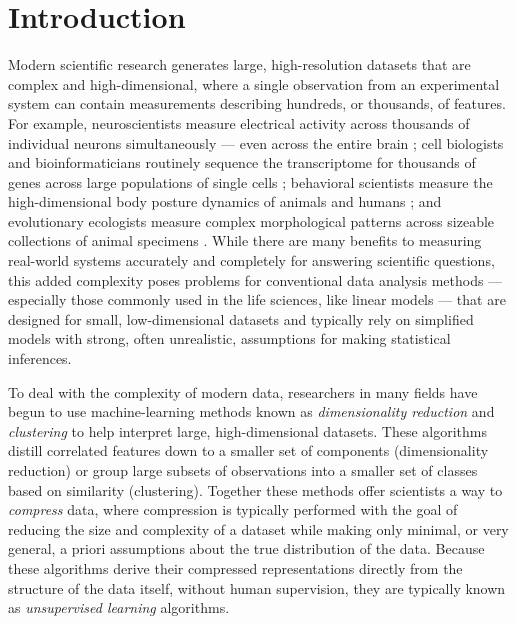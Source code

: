 \documentclass[11pt,a4paper,oneside]{book}
\begin{document}
\section{Introduction}
Modern scientific research generates large, high-resolution datasets that are complex and high-dimensional, where a single observation from an experimental system can contain measurements describing hundreds, or thousands, of features. For example, neuroscientists measure electrical activity across thousands of individual neurons simultaneously \citep{jun2017fully, stringer2019high, stringer2019spontaneous} --- even across the entire brain \citep{ahrens2012brain,ahrens2013whole}; cell biologists and bioinformaticians routinely sequence the transcriptome for thousands of genes across large populations of single cells \citep{samusik2016automated, la2018rna, becht2019dimensionality, linderman2019fast}; behavioral scientists measure the high-dimensional body posture dynamics of animals and humans \citep{stephens2008dimensionality, stephens2011emergence, kain2013leg, berman2014mapping, wiltschko2015mapping, klibaite2017unsupervised, Costa1501, cande2018optogenetic, mathis2018deeplabcut, chambers2019pose, gunel2019deepfly3d, graving2019deepposekit, klibaite2019interacting,
nath2019using,pereira2019fast, bala2020openmonkeystudio, ebbesen2020social, karashchuk2020anipose}; and evolutionary ecologists measure complex morphological patterns across sizeable collections of animal specimens \citep{cuthill2017biology, cuthill2019deep, ezray2019unsupervised, wham2019measuring, zhang2019shell}. While there are many benefits to measuring real-world systems accurately and completely for answering scientific questions, this added complexity poses problems for conventional data analysis methods --- especially those commonly used in the life sciences, like linear models \citep{bolker2009generalized} --- that are designed for small, low-dimensional datasets and typically rely on simplified models with strong, often unrealistic, assumptions for making statistical inferences.

To deal with the complexity of modern data, researchers in many fields have begun to use machine-learning methods known as \textit{dimensionality reduction} and \textit{clustering} to help interpret large, high-dimensional datasets. These algorithms distill correlated features down to a smaller set of components (dimensionality reduction) or group large subsets of observations into a smaller set of classes based on similarity (clustering). Together these methods offer scientists a way to \textit{compress} data, where compression is typically performed with the goal of reducing the size and complexity of a dataset while making only minimal, or very general, a priori assumptions about the true distribution of the data. Because these algorithms derive their compressed representations directly from the structure of the data itself, without human supervision, they are typically known as \textit{unsupervised learning} algorithms. 
\end{document}
